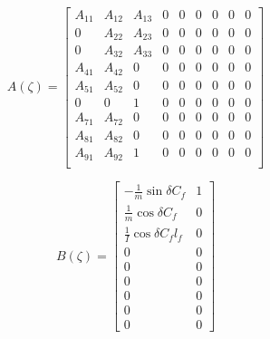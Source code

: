 \documentclass[a4paper,fleqn]{cas-sc}
\begin{document}
\noindent\begin{minipage}{.5\linewidth}    
    \begin{equation}
        \label{eq:final_LPV_A_elements}
        A(\zeta) =	\left[\begin{array}{ccccccccc}
                    A_{11}  & A_{12}    & A_{13}    & 0 & 0  & 0 & 0 & 0 & 0 \\
                    0       & A_{22}    & A_{23}    & 0 & 0  & 0 & 0 & 0 & 0 \\
                    0       & A_{32}    & A_{33}    & 0 & 0  & 0 & 0 & 0 & 0  \\
                    A_{41}  &  A_{42}    & 0    &  0  &  0  & 0 & 0  & 0 & 0   \\
                    A_{51}   & A_{52}    & 0  & 0 & 0 & 0 & 0  & 0 & 0\\
                    0  & 0    & 1 & 0 & 0  & 0 & 0  & 0 & 0 \\ 
                    A_{71}       & A_{72}    & 0    & 0 & 0 & 0 & 0 & 0 & 0    \\
                    A_{81}  & A_{82}    & 0 & 0 & 0  & 0 & 0  & 0 & 0  \\ 
                    A_{91}        & A_{92}    & 1    & 0 & 0 & 0 & 0 & 0 & 0   \\
        \end{array}\right]
   \end{equation}
\end{minipage}%
\begin{minipage}{.5\linewidth}  
   \begin{equation}
        \label{eq:final_LPV_B_elements}
        B(\zeta) = \left[\begin{array}{cc}
                    -\frac{1}{m} \sin{\delta} C_f & 1 \\
                    \frac{1}{m} \cos{\delta} C_f & 0 \\
                    \frac{1}{I} \cos{\delta} C_f l_f  & 0 \\
                    0 & 0 \\
                    0 & 0 \\
                    0 & 0 \\
                    0 & 0 \\
                    0 & 0 \\
                    0 & 0 
        \end{array}\right] 
    \end{equation}
\end{minipage}\\
\end{document}
